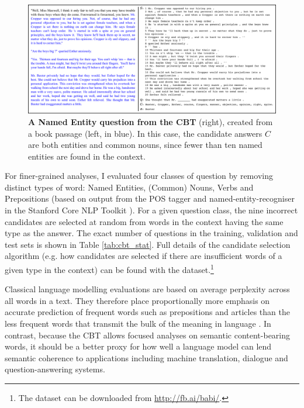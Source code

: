 \begin{figure}[h]
\centering
\includegraphics[width=\textwidth]{Chapter_6/cbt_fig1.png}
\caption{{\bf A Named Entity question from the CBT} (right), created from a book passage (left, in blue). In this case, the candidate answers \(C\) are both entities and common nouns, since fewer than ten named entities are found in the context.}
\label{fig:goldilocks}
\end{figure}

For finer-grained analyses, I evaluated four classes of question by removing distinct types of word: Named Entities, (Common) Nouns, Verbs and Prepositions (based on output from the POS tagger and named-entity-recogniser in the Stanford Core NLP Toolkit \citep{manning2014stanford}). For a given question class, the nine incorrect candidates are selected at random from words in the context having the same type as the answer. The exact number of questions in the training, validation and test sets is shown in Table \ref{tab:cbt_stat}. Full details of the candidate selection algorithm (e.g. how candidates are selected if there are insufficient words of a given type in the context) can be found with the dataset.\footnote{The dataset can be downloaded from \url{http://fb.ai/babi/}.}

Classical language modelling evaluations are based on average perplexity across all words in a text. They therefore place proportionally more emphasis on accurate prediction of frequent words such as prepositions and articles than the less frequent words that transmit the bulk of the meaning in language \citep{baayen1996word}. In contrast, because the CBT allows focused analyses on semantic content-bearing words, it should be a better proxy for how well a language model can lend semantic coherence to applications including machine translation, dialogue and question-answering systems. 


